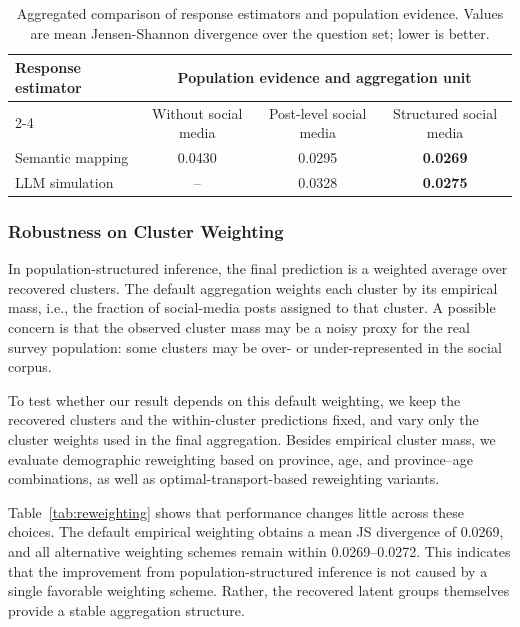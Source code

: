 \documentclass{article}
\begin{document}
\begin{table}[htb!]
\centering
\small
\begin{tabular}{lccc}
\toprule
\multirow{2}{*}{Response estimator}
& \multicolumn{3}{c}{Population evidence and aggregation unit} \\
\cmidrule(lr){2-4}
& Without social media & Post-level social media & Structured social media \\
\midrule
Semantic mapping & 0.0430 & 0.0295 & \textbf{0.0269} \\
LLM simulation & -- & 0.0328 & \textbf{0.0275} \\
\bottomrule
\end{tabular}
\caption{Aggregated comparison of response estimators and population evidence. Values are mean Jensen-Shannon divergence over the question set; lower is better.}
\label{tab:2by2_results}
\end{table}

\subsubsection{Robustness on Cluster Weighting}
\label{clustering_scheme}

In population-structured inference, the final prediction is a weighted average over recovered clusters.
The default aggregation weights each cluster by its empirical mass,
i.e., the fraction of social-media posts assigned to that cluster.
A possible concern is that the observed cluster mass may be a noisy proxy for the real survey population:
some clusters may be over- or under-represented in the social corpus.

To test whether our result depends on this default weighting,
we keep the recovered clusters and the within-cluster predictions fixed,
and vary only the cluster weights used in the final aggregation.
Besides empirical cluster mass, we evaluate demographic reweighting based on province,
age, and province--age combinations,
as well as optimal-transport-based reweighting variants.

Table~\ref{tab:reweighting} shows that performance changes little across these choices.
The default empirical weighting obtains a mean JS divergence of 0.0269,
and all alternative weighting schemes remain within 0.0269--0.0272.
This indicates that the improvement from population-structured inference is not caused by a single favorable weighting scheme.
Rather, the recovered latent groups themselves provide a stable aggregation structure.
\end{document}
